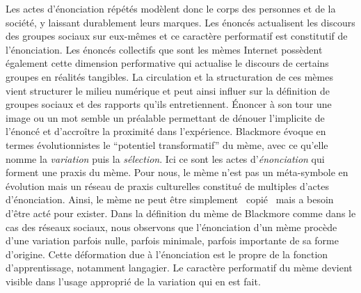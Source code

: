 Les actes d{\textquoteright}énonciation répétés modèlent donc le corps des personnes et de la société, y laissant durablement leurs marques. Les énoncés actualisent les discours des groupes sociaux sur eux-mêmes \citep{Butler1993} et ce caractère performatif est constitutif de l{\textquoteright}énonciation. Les énoncés collectifs que sont les mèmes Internet possèdent également cette dimension performative qui actualise le discours de certains groupes en réalités tangibles. La circulation et la structuration de ces mèmes vient structurer le milieu numérique et peut ainsi influer sur la définition de groupes sociaux et des rapports qu{\textquoteright}ils entretiennent. \'Enoncer à son tour une image ou un mot semble un préalable permettant de dénouer l{\textquoteright}implicite de l{\textquoteright}énoncé et d'accroître la proximité dans l{\textquoteright}expérience. Blackmore évoque en termes évolutionnistes le {\textquotedblleft}potentiel transformatif{\textquotedblright} du mème, avec ce qu{\textquoteright}elle nomme la \textit{variation} puis la \textit{sélection}. Ici ce sont les actes d{\textquoteright}\textit{énonciation} qui forment une praxis du mème. Pour nous, le mème n{\textquoteright}est pas un méta-symbole en évolution mais un réseau de praxis culturelles constitué de multiples d{\textquoteright}actes d{\textquoteright}énonciation. Ainsi, le mème ne peut être simplement {\guillemotleft}~copié~{\guillemotright} mais a besoin d{\textquoteright}être acté pour exister. Dans la définition du mème de Blackmore comme dans le cas des réseaux sociaux, nous observons que l{\textquoteright}énonciation d{\textquoteright}un mème procède d{\textquoteright}une variation parfois nulle, parfois minimale, parfois importante de sa forme d{\textquoteright}origine. Cette déformation due à l{\textquoteright}énonciation est le propre de la fonction d{\textquoteright}apprentissage, notamment langagier. Le caractère performatif du mème devient visible dans l{\textquoteright}usage approprié de la variation qui en est fait. 

